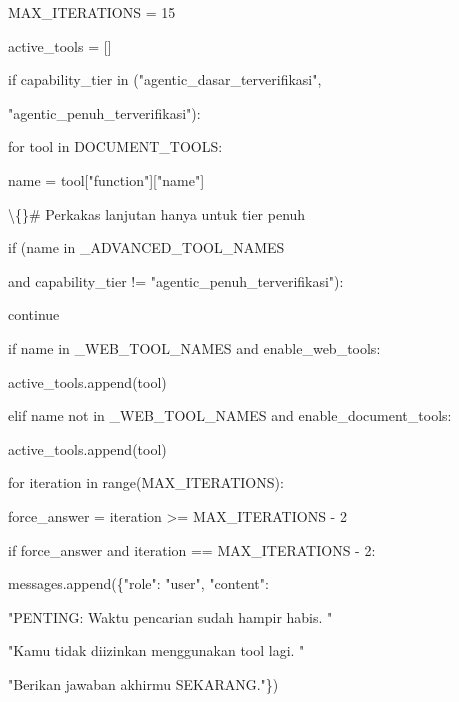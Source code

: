 \documentclass[12pt,a4paper]{article}
\begin{document}
MAX\_ITERATIONS = 15



active\_tools = {[}{]}



if capability\_tier in ("agentic\_dasar\_terverifikasi",



"agentic\_penuh\_terverifikasi"):



for tool in DOCUMENT\_TOOLS:



name = tool{[}"function"{]}{[}"name"{]}



\textbackslash\{\}\# Perkakas lanjutan hanya untuk tier penuh



if (name in \_ADVANCED\_TOOL\_NAMES



and capability\_tier != "agentic\_penuh\_terverifikasi"):



continue



if name in \_WEB\_TOOL\_NAMES and enable\_web\_tools:



active\_tools.append(tool)



elif name not in \_WEB\_TOOL\_NAMES and enable\_document\_tools:



active\_tools.append(tool)



for iteration in range(MAX\_ITERATIONS):



force\_answer = iteration \textgreater{}= MAX\_ITERATIONS - 2



if force\_answer and iteration == MAX\_ITERATIONS - 2:



messages.append(\{"role": "user", "content":



"PENTING: Waktu pencarian sudah hampir habis. "



"Kamu tidak diizinkan menggunakan tool lagi. "



"Berikan jawaban akhirmu SEKARANG."\})
\end{document}

